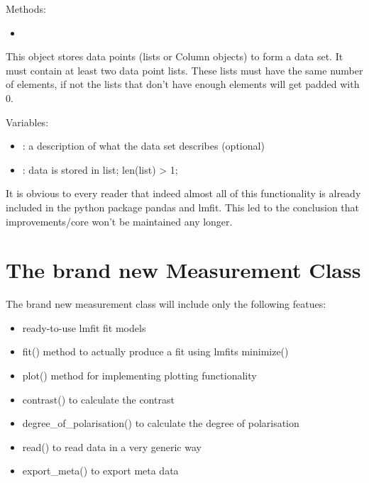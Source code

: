 \documentclass[letterpaper,10pt,english]{sphinxmanual}
\begin{document}
Methods:
\begin{itemize}
\item {} 

\end{itemize}


This object stores data points (lists or Column objects) to form a data set. It must contain at least two data point lists. These lists must have the same number of elements, if not the lists that don’t have enough elements will get padded with 0.

Variables:
\begin{itemize}
\item {} 
: a description of what the data set describes (optional)

\item {} 
: data is stored in list; len(list) \textgreater{} 1;

\end{itemize}

It is obvious to every reader that indeed almost all of this functionality is already included in the python package pandas and lmfit. This led to the conclusion that improvements/core won’t be maintained any longer.


\section{The brand new Measurement Class}
\label{\detokenize{measurement2:the-brand-new-measurement-class}}
The brand new measurement class will include only the following featues:
\begin{itemize}
\item {} 
ready-to-use lmfit fit models

\item {} 
fit() method to actually produce a fit using lmfits minimize()

\item {} 
plot() method for implementing plotting functionality

\item {} 
contrast() to calculate the contrast

\item {} 
degree\_of\_polarisation() to calculate the degree of polarisation

\item {} 
read() to read data in a very generic way

\item {} 
export\_meta() to export meta data

\end{itemize}
\end{document}
